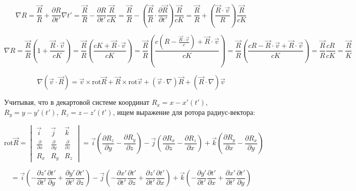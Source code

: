 \documentclass[12pt, a4paper]{article}
\begin{document}
\begin{equation}
\nabla R = \frac{\vec{R}}{R} + \frac{\partial R}{\partial t'} \nabla t' = \frac{\vec{R}}{R} - \frac{\partial R}{\partial t'} \frac{\vec{R}}{cK} = \frac{\vec{R}}{R} - \left( \frac{\vec{R}}{R} \cdot \frac{\partial \vec{R}}{\partial t'} \right) \frac{\vec{R}}{cK} = \frac{\vec{R}}{R} + \left( \frac{\vec{R} \cdot \vec{v}}{R} \right) \frac{\vec{R}}{cK}
\label{eq:grad_R_expanded}
\end{equation}

\begin{equation}
\nabla R = \frac{\vec{R}}{R} \left( 1 + \frac{\vec{R} \cdot \vec{v}}{cK} \right) = \frac{\vec{R}}{R} \left( \frac{cK + \vec{R} \cdot \vec{v}}{cK} \right) = \frac{\vec{R}}{R} \left( \frac{c \left( R - \frac{\vec{R} \cdot \vec{v}}{c} \right) + \vec{R} \cdot \vec{v}}{cK} \right) = \frac{\vec{R}}{R} \left( \frac{cR - \vec{R} \cdot \vec{v} + \vec{R} \cdot \vec{v}}{cK} \right) = \frac{\vec{R}}{R} \frac{cR}{cK} = \frac{\vec{R}}{K}
\label{eq:grad_R_final}
\end{equation}

\begin{equation}
\nabla (\vec{v} \cdot \vec{R}) = \vec{v} \times \text{rot} \vec{R} + \vec{R} \times \text{rot} \vec{v} + (\vec{v} \cdot \nabla) \vec{R} + (\vec{R} \cdot \nabla) \vec{v}
\label{eq:grad_vR}
\end{equation}

Учитывая, что в декартовой системе координат $R_x = x - x'(t')$, $R_y = y - y'(t')$, $R_z = z - z'(t')$, ищем выражение для ротора радиус-вектора:

\begin{equation}
\text{rot} \vec{R} = \begin{vmatrix} \vec{i} & \vec{j} & \vec{k} \\ \frac{\partial}{\partial x} & \frac{\partial}{\partial y} & \frac{\partial}{\partial z} \\ R_x & R_y & R_z \end{vmatrix} = \vec{i} \left( \frac{\partial R_z}{\partial y} - \frac{\partial R_y}{\partial z} \right) - \vec{j} \left( \frac{\partial R_x}{\partial z} - \frac{\partial R_z}{\partial x} \right) + \vec{k} \left( \frac{\partial R_y}{\partial x} - \frac{\partial R_x}{\partial y} \right)
\label{eq:rot_R}
\end{equation}

\begin{equation}
= \vec{i} \left( -\frac{\partial z'}{\partial t'} \frac{\partial t'}{\partial y} + \frac{\partial y'}{\partial t'} \frac{\partial t'}{\partial z} \right) - \vec{j} \left( -\frac{\partial x'}{\partial t'} \frac{\partial t'}{\partial z} + \frac{\partial z'}{\partial t'} \frac{\partial t'}{\partial x} \right) + \vec{k} \left( -\frac{\partial y'}{\partial t'} \frac{\partial t'}{\partial x} + \frac{\partial x'}{\partial t'} \frac{\partial t'}{\partial y} \right)
\label{eq:rot_R_expanded}
\end{equation}
\end{document}

